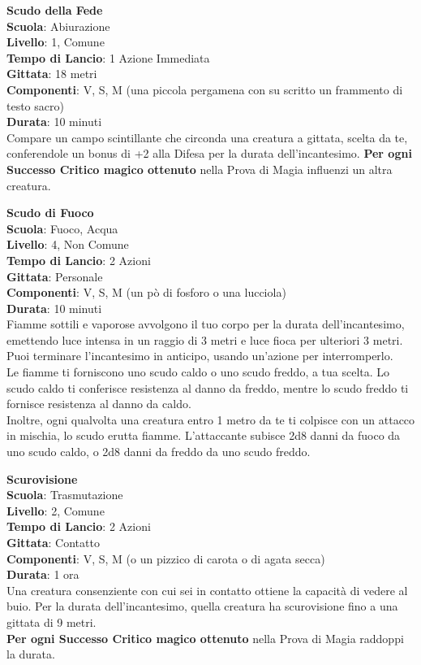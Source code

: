 \begin{multicols}{2}
\medskip\textbf{Scudo della Fede}\\
\textbf{Scuola}: Abiurazione\\
\textbf{Livello}: 1, Comune\\
\textbf{Tempo di Lancio}: 1 Azione Immediata\\
\textbf{Gittata}: 18 metri\\
\textbf{Componenti}: V, S, M (una piccola pergamena con su scritto un frammento di testo sacro)\\
\textbf{Durata}: 10 minuti\\
Compare un campo scintillante che circonda una creatura a gittata, scelta da te, conferendole un bonus di +2 alla Difesa per la durata dell'incantesimo.
\textbf{Per ogni Successo Critico magico ottenuto} nella Prova di Magia influenzi un altra creatura.

\medskip\textbf{Scudo di Fuoco}\\
\textbf{Scuola}: Fuoco, Acqua\\
\textbf{Livello}: 4, Non Comune\\
\textbf{Tempo di Lancio}: 2 Azioni\\
\textbf{Gittata}: Personale\\
\textbf{Componenti}: V, S, M (un pò di fosforo o una lucciola) \\
\textbf{Durata}: 10 minuti\\
Fiamme sottili e vaporose avvolgono il tuo corpo per la durata dell'incantesimo, emettendo luce intensa in un raggio di 3 metri e luce fioca per ulteriori 3 metri. Puoi terminare l'incantesimo in anticipo, usando un'azione per interromperlo.\\
Le fiamme ti forniscono uno scudo caldo o uno scudo freddo, a tua scelta. Lo scudo caldo ti conferisce resistenza al danno da freddo, mentre lo scudo freddo ti fornisce resistenza al danno da caldo.\\
Inoltre, ogni qualvolta una creatura entro 1 metro da te ti colpisce con un attacco in mischia, lo scudo erutta fiamme. L'attaccante subisce 2d8 danni da fuoco da uno scudo caldo, o 2d8 danni da freddo da uno scudo freddo.

\medskip\textbf{Scurovisione}\\
\textbf{Scuola}: Trasmutazione\\
\textbf{Livello}: 2, Comune\\
\textbf{Tempo di Lancio}: 2 Azioni\\
\textbf{Gittata}: Contatto\\
\textbf{Componenti}: V, S, M (o un pizzico di carota o di agata secca)\\
\textbf{Durata}: 1 ora\\
Una creatura consenziente con cui sei in contatto ottiene la capacità di vedere al buio. Per la durata dell'incantesimo, quella creatura ha scurovisione fino a una gittata di 9 metri.\\
\textbf{Per ogni Successo Critico magico ottenuto} nella Prova di Magia raddoppi la durata.



\end{multicols}

